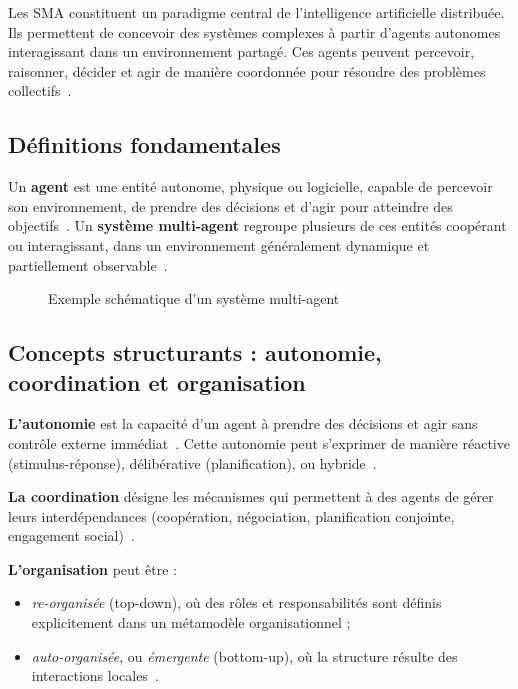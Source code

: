 \documentclass[ twoside,openright,titlepage,numbers=noenddot,headinclude,%
                footinclude=true,cleardoublepage=empty,abstractoff, %
                BCOR=5mm,paper=a4,fontsize=11pt,%
                french,american,%
                ]{scrreprt}
\begin{document}
Les SMA constituent un paradigme central de l'intelligence artificielle distribuée. Ils permettent de concevoir des systèmes complexes à partir d'agents autonomes interagissant dans un environnement partagé. Ces agents peuvent percevoir, raisonner, décider et agir de manière coordonnée pour résoudre des problèmes collectifs~\cite{Ferber1999,Wooldridge2009}.

\subsection*{Définitions fondamentales}

Un \textbf{agent} est une entité autonome, physique ou logicielle, capable de percevoir son environnement, de prendre des décisions et d'agir pour atteindre des objectifs~\cite{Russell2010}. Un \textbf{système multi-agent} regroupe plusieurs de ces entités coopérant ou interagissant, dans un environnement généralement dynamique et partiellement observable~\cite{Jennings1998,Shoham2009}.

\begin{figure}[h]
    \centering
    \caption{Exemple schématique d'un système multi-agent}
    \label{fig:sma_architecture}
\end{figure}

\subsection*{Concepts structurants : autonomie, coordination et organisation}

\textbf{L'autonomie} est la capacité d'un agent à prendre des décisions et agir sans contrôle externe immédiat~\cite{Russell2010}. Cette autonomie peut s'exprimer de manière réactive (stimulus-réponse), délibérative (planification), ou hybride~\cite{Georgeff1999}.

\textbf{La coordination} désigne les mécanismes qui permettent à des agents de gérer leurs interdépendances (coopération, négociation, planification conjointe, engagement social)~\cite{Durfee1999,Jennings1996,Sandholm1999}.

\textbf{L'organisation} peut être :
\begin{itemize}
    \item \emph{re-organisée} (top-down), où des rôles et responsabilités sont définis explicitement dans un métamodèle organisationnel ;
    \item \emph{auto-organisée}, ou \emph{émergente} (bottom-up), où la structure résulte des interactions locales~\cite{Heylighen2001,DiMarzoSerugendo2005}.
\end{itemize}
\end{document}
